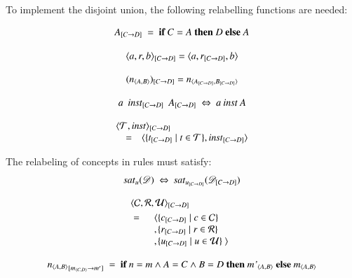 \documentclass{elsarticle}
\begin{document}
To implement the disjoint union, the following relabelling functions are needed:
\begin{definition}
   \[\subst{C}{D}{A}\ =\ \text{\bf if}\ C=A\ \text{\bf then}\ D\ \text{\bf else}\ A\]
\end{definition}
\begin{definition}
   \[\subst{C}{D}{\triple{a}{r}{b}} = \triple{a}{\subst{C}{D}{r}}{b}\]
\end{definition}
\begin{definition}
   \[\subst{C}{D}{(\declare{n}{A}{B})} = \declare{n}{\subst{C}{D}{A}}{\subst{C}{D}{B}}\]
\end{definition}
\begin{definition}
   \[a\ \subst{C}{D}{\inst}\ \subst{C}{D}{A}\ \Leftrightarrow\ a\inst A\]
\end{definition}
\begin{definition}
   \[\begin{array}{rcl}
      \rlap{$\subst{C}{D}{\pair{\triples}{\inst}}$}\\
      &=&\pair{\{\subst{C}{D}{t}\mid t\in\triples\}}{\subst{C}{D}{\inst}}
   \end{array}\]
\end{definition}
   The relabeling of concepts in rules must satisfy:
\begin{equation}
   \sat{u}{\dataset}\ \Leftrightarrow\ \sat{\subst{C}{D}{u}}{\subst{C}{D}{\dataset}}
\end{equation}
\begin{definition}
   \begin{eqnarray}
      \rlap{$\subst{C}{D}{\triple{\concepts}{\rels}{\rules}}$}\notag\\
      &=&\begin{array}[t]{l@{}l}
         \la&\{\subst{C}{D}{c}\mid c\in\concepts\}\\
         ,&\{\subst{C}{D}{r}\mid r\in\rels\}\\
         ,&\{\subst{C}{D}{u}\mid u\in\rules\}\ \ra\notag
         \end{array}
   \end{eqnarray}
\end{definition}
\begin{definition}
   \[\subst{\declare{m}{C}{D}}{m'}{{\declare{n}{A}{B}}}\ =\ \text{\bf if}\ n=m\wedge A=C\wedge B=D\ \text{\bf then}\ \declare{m'}{A}{B}\ \text{\bf else}\ \declare{m}{A}{B}\]
\end{definition}
\end{document}
